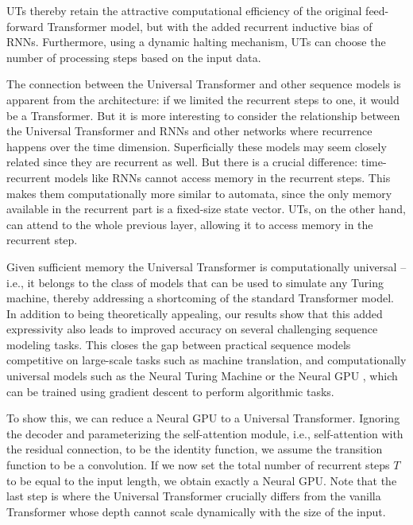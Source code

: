 UTs thereby retain the attractive computational efficiency of the original feed-forward Transformer model, but with the added recurrent inductive bias of RNNs. Furthermore, using a dynamic halting mechanism, UTs can choose the number of processing steps based on the input data. %

The connection between the Universal Transformer and other sequence models is apparent from the architecture: if we limited the recurrent steps to one, it would be a Transformer. But it is more interesting to consider the relationship between the Universal Transformer and RNNs and other networks where recurrence happens over the time dimension. Superficially these models may seem closely related since they are recurrent as well. But there is a crucial difference: time-recurrent models like RNNs cannot access memory in the recurrent steps. This makes them computationally more similar to automata, since the only memory available in the recurrent part is a fixed-size state vector. UTs, on the other hand, can attend to the whole previous layer, allowing it to access memory in the recurrent step. 

Given sufficient memory the Universal Transformer is computationally universal -- i.e., it belongs to the class of models that can be used to simulate any Turing machine, thereby addressing a shortcoming of the standard Transformer model. In addition to being theoretically appealing, our results show that this added expressivity also leads to improved accuracy on several challenging sequence modeling tasks. This closes the gap between practical sequence models competitive on large-scale tasks such as machine translation, and computationally universal models such as the Neural Turing Machine or the Neural GPU \citep{ntm14,neural_gpu}, which can be trained using gradient descent to perform algorithmic tasks.

To show this, we can reduce a Neural GPU to a Universal Transformer. Ignoring the decoder and parameterizing the self-attention module, i.e., self-attention with the residual connection, to be the identity function, we assume the transition function to be a convolution. If we now set the total number of recurrent steps $T$ to be equal to the input length, we obtain exactly a Neural GPU. Note that the last step is where the Universal Transformer crucially differs from the vanilla Transformer whose depth cannot scale dynamically with the size of the input. 

